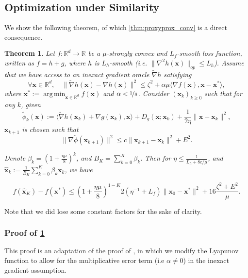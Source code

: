 \documentclass{article}
\def\vx{{\bm{x}}}
\newcommand{\R}{\mathbb{R}}
\DeclareMathOperator*{\argmin}{arg\,min}
\theoremstyle{plain}
\newtheorem{theorem}{Theorem}[section]
\theoremstyle{definition}
\theoremstyle{remark}
\begin{document}
\subsection{Optimization under Similarity}
\label{app:proof:proxyprox}
We  show the following theorem, of which \cref{thm:proxyprox_conv} is a direct consequence.

\begin{theorem}
\label{app:thm:proxy_prox_inexact}
   Let $f:\R^d \rightarrow \R$ be a $\mu$-strongly convex and $L_f$-smooth loss function, written as $f = h + g$, where $h$ is $L_h$-smooth (i.e. $\|\nabla^2 h(\vx)\|_{op} \le L_h$). 
Assume that we have access to an inexact gradient oracle $\tilde \nabla h$ satisfying
\begin{equation}
\label{app:eq:inexact_gradient_scalar_product}
\forall \vx\in\R^d, \quad\|\tilde \nabla h(\vx) - \nabla h(\vx)\|^2 \le \zeta^2 + \alpha \mu \langle \nabla f(\vx), \vx - \vx^* \rangle,
\end{equation}
where \(\vx^* := \argmin_{\vx\in \R^d}f(\vx)\) and $\alpha < \nicefrac{1}{8}$.
   Consider $(\vx_{k})_{k\ge 0}$ such that for any $k$, given 
   \begin{equation}
   \label{app:eq:def_phi_k}
       \tilde{\phi}_k(\vx) := \langle \tilde{\nabla} h(\vx_k) + \nabla g(\vx_k), \vx \rangle + D_{g}(\vx;\vx_k) + \frac{1}{2\eta}\|\vx - \vx_k\|^2,
   \end{equation}
$\vx_{k+1}$ is chosen such that
\begin{equation}
\label{app:eq:error_in_prox}
\|\nabla \tilde{\phi} (\vx_{k+1})\|^2 \le c\|\vx_{k+1} - \vx_k\|^2 + E^2.
\end{equation}

Denote $\beta_k = (1 + \frac{\eta \mu}{8})^{k}$, and $B_K = \sum_{k=0}^K \beta_k$. Then for $\eta \le \frac{1}{L_h + 8c/\mu}$, and $\hat{\vx}_k := \frac{1}{B_K}\sum_{k=0}^K \beta_k \vx_k$, we have

\[
f(\hat\vx_{K}) - f(\vx^*) \le \left(1 + \frac{\eta \mu}{8}\right)^{1-K}2(\eta^{-1} + L_f)\|\vx_0 - \vx^*\|^2 + 16\frac{\zeta^2 + E^2}{\mu}.
\]
\end{theorem}

Note that we did lose some constant factors for the sake of clarity.

\subsubsection{Proof of \cref{app:thm:proxy_prox_inexact}}
This proof is an adaptation of the proof of \citet{woodworth2023two}, in which we modify the Lyapunov function to allow for the multiplicative error term (i.e $\alpha \neq 0$) in the inexact gradient assumption. 
\end{document}
